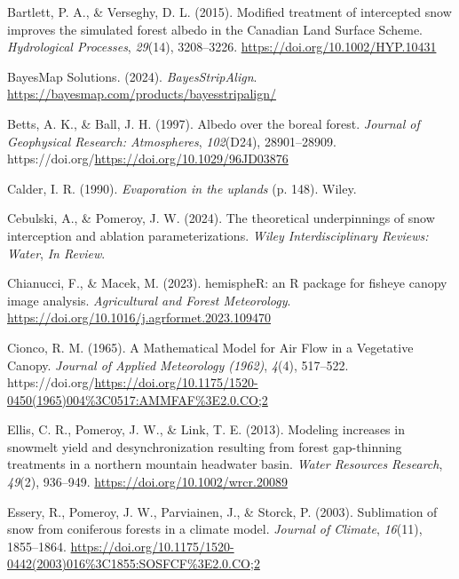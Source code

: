 \documentclass[
  letterpaper,
  DIV=11,
  numbers=noendperiod]{scrartcl}
\newlength{\cslhangindent}
\newenvironment{CSLReferences}[2] %
 {\begin{list}{}{%
  \setlength{\itemindent}{0pt}
  \setlength{\leftmargin}{0pt}
  \setlength{\parsep}{0pt}
  \ifodd #1
   \setlength{\leftmargin}{\cslhangindent}
   \setlength{\itemindent}{-1\cslhangindent}
  \fi
  \setlength{\itemsep}{#2\baselineskip}}}
 {\end{list}}
\begin{document}
\label{refs}
\begin{CSLReferences}{1}{0}
Bartlett, P. A., \& Verseghy, D. L. (2015). {Modified treatment of
intercepted snow improves the simulated forest albedo in the Canadian
Land Surface Scheme}. \emph{Hydrological Processes}, \emph{29}(14),
3208--3226. \url{https://doi.org/10.1002/HYP.10431}

BayesMap Solutions. (2024). \emph{{BayesStripAlign}}.
\url{https://bayesmap.com/products/bayesstripalign/}

Betts, A. K., \& Ball, J. H. (1997). {Albedo over the boreal forest}.
\emph{Journal of Geophysical Research: Atmospheres}, \emph{102}(D24),
28901--28909. https://doi.org/\url{https://doi.org/10.1029/96JD03876}

Calder, I. R. (1990). \emph{{Evaporation in the uplands}} (p. 148).
Wiley.

Cebulski, A., \& Pomeroy, J. W. (2024). {The theoretical underpinnings
of snow interception and ablation parameterizations}. \emph{Wiley
Interdisciplinary Reviews: Water}, \emph{In Review}.

Chianucci, F., \& Macek, M. (2023). {hemispheR: an R package for fisheye
canopy image analysis}. \emph{Agricultural and Forest Meteorology}.
\url{https://doi.org/10.1016/j.agrformet.2023.109470}

Cionco, R. M. (1965). {A Mathematical Model for Air Flow in a Vegetative
Canopy}. \emph{Journal of Applied Meteorology (1962)}, \emph{4}(4),
517--522.
https://doi.org/\url{https://doi.org/10.1175/1520-0450(1965)004\%3C0517:AMMFAF\%3E2.0.CO;2}

Ellis, C. R., Pomeroy, J. W., \& Link, T. E. (2013). {Modeling increases
in snowmelt yield and desynchronization resulting from forest
gap-thinning treatments in a northern mountain headwater basin}.
\emph{Water Resources Research}, \emph{49}(2), 936--949.
\url{https://doi.org/10.1002/wrcr.20089}

Essery, R., Pomeroy, J. W., Parviainen, J., \& Storck, P. (2003).
{Sublimation of snow from coniferous forests in a climate model}.
\emph{Journal of Climate}, \emph{16}(11), 1855--1864.
\url{https://doi.org/10.1175/1520-0442(2003)016\%3C1855:SOSFCF\%3E2.0.CO;2}


\end{CSLReferences}
\end{document}
